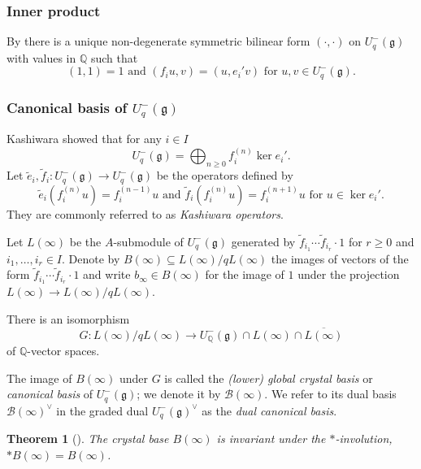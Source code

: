 \documentclass[final]{amsart}
\theoremstyle{plain}
\newtheorem{theorem}[corollary]{Theorem}
\theoremstyle{definition}
\newcommand{\calB}{\mathcal B}
\newcommand{\bbQ}{\mathbb Q}
\newcommand{\frakg}{\mathfrak g}
\newcommand{\te}{\tilde e}
\newcommand{\tf}{\tilde f}
\begin{document}
\subsubsection*{Inner product}

By \cite{Kashiwara:CrystalBases-QuantizedUniversalEnvelopingAlgebras} there is a unique non-degenerate symmetric bilinear form $(\cdot, \cdot)$ on $U_q^-(\frakg)$ with values in $\bbQ$ such that
\[
    (1, 1) = 1 \text{ and } (f_iu, v) = (u, e_i'v) \text{ for } u, v\in U_q^-(\frakg).
\]

\subsubsection*{Canonical basis of $U_q^-(\frakg)$}
\label{section:canonical-basis-definition}

Kashiwara \cite{Kashiwara:CrystalBases-QuantizedUniversalEnvelopingAlgebras} showed that for any $i\in I$
\[
    U_q^-(\frakg) = \bigoplus_{n\ge 0} f_i^{(n)} \ker e_i'.
\]
Let $\te_i, \tf_i\colon U_q^-(\frakg) \to U_q^-(\frakg)$ be the operators defined by
\[
    \te_i(f_i^{(n)}u) = f_i^{(n-1)}u
    \text{ and }
    \tf_i(f_i^{(n)}u) = f_i^{(n+1)}u
    \text{ for } u \in \ker e_i'.
\]
They are commonly referred to as \emph{Kashiwara operators}.

Let $L(\infty)$ be the $A$-submodule of $U_q^-(\frakg)$ generated by $\tf_{i_1}\cdots \tf_{i_r} \cdot 1$ for $r \ge 0$ and $i_1, \dots, i_r \in I$.
Denote by $B(\infty) \subseteq L(\infty)/qL(\infty)$ the images of vectors of the form $\tf_{i_1}\cdots \tf_{i_r} \cdot 1$ and write $b_\infty \in B(\infty)$ for the image of $1$ under the projection $L(\infty) \to L(\infty)/qL(\infty)$.

There is an isomorphism \cite[Theorem 6]{Kashiwara:CrystalBases-QuantizedUniversalEnvelopingAlgebras}
\[
    G\colon L(\infty)/qL(\infty) \to U_\bbQ^-(\frakg) \cap L(\infty) \cap \overline{L(\infty)}
\]
of $\bbQ$-vector spaces.

The image of $B(\infty)$ under $G$ is called the \emph{(lower) global crystal basis} or \emph{canonical basis} of $U_q^-(\frakg)$; we denote it by $\calB(\infty)$.
We refer to its dual basis $\calB(\infty)^\vee$ in the graded dual $U_q^-(\frakg)^\vee$ as the \emph{dual canonical basis}.

\begin{theorem}[{\cite[Theorem 2.1.1]{Kashiwara:CrystalBase-Littelmann-DemazureCharacterFormula}}]
    \label{theorem:crystal-base-star-invariance}
    The crystal base $B(\infty)$ is invariant under the $*$-involution, $*B(\infty) = B(\infty)$.
\end{theorem}
\end{document}
